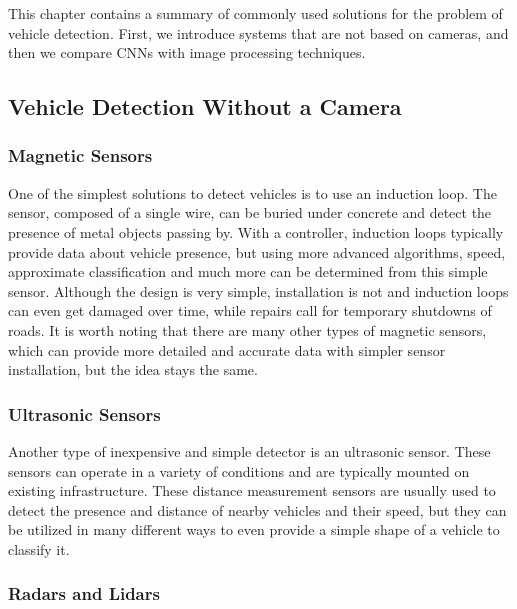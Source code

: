This chapter contains a summary of commonly used solutions for the problem of
vehicle detection. First, we introduce systems that are not based on cameras,
and then we compare CNNs with image processing techniques. 


\subsection*{Vehicle Detection Without a Camera}


\subsubsection*{Magnetic Sensors}

One of the simplest solutions to detect vehicles is to use an induction
loop.\cite{MagneticSensors} The sensor, composed of a single wire, can be buried
under concrete and detect the presence of metal objects passing by. With a
controller, induction loops typically provide data about vehicle presence, but
using more advanced algorithms, speed, approximate classification and much more
can be determined from this simple sensor. Although the design is very simple,
installation is not and induction loops can even get damaged over time, while
repairs call for temporary shutdowns of roads. It is worth noting that there
are many other types of magnetic sensors, which can provide more detailed and
accurate data with simpler sensor installation, but the idea stays the same.

\subsubsection*{Ultrasonic Sensors}

Another type of inexpensive and simple detector is an ultrasonic
sensor.\cite{UltrasonicSensors} These sensors can operate in a variety of
conditions and are typically mounted on existing infrastructure. These distance
measurement sensors are usually used to detect the presence and distance of nearby
vehicles and their speed, but they can be utilized in many different ways to
even provide a simple shape of a vehicle to classify it.

\subsubsection*{Radars and Lidars}

